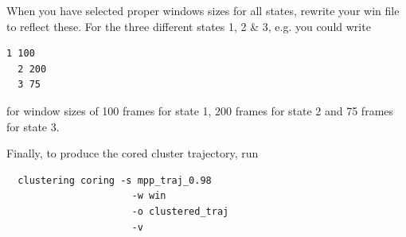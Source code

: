 \documentclass[12pt,a4paper,twoside,english,fleqn]{article}
\begin{document}
When you have selected proper windows sizes for all states, rewrite your
{\ttfamily win} file to reflect these. For the three different states 1, 2
\& 3, e.g. you could write
\begin{lstlisting}[basicstyle=\ttfamily]
  1 100
  2 200
  3 75
\end{lstlisting}
for window sizes of 100 frames for state 1, 200 frames for state 2 and 75
frames for state 3.

Finally, to produce the cored cluster trajectory, run
\begin{lstlisting}
  clustering coring -s mpp_traj_0.98
                      -w win
                      -o clustered_traj
                      -v
\end{lstlisting}



\end{document}
